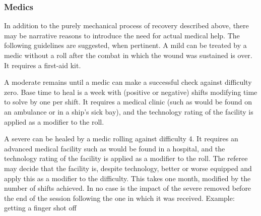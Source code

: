 \subsubsection{Medics}

In addition to the purely mechanical process of recovery described above, there may be narrative reasons to introduce the need for actual medical help. The following guidelines are suggested, when pertinent. A mild \Consequence{} can be treated by a medic without a roll after the combat in which the wound was sustained is over. It requires a first-aid kit.

A moderate \Consequence{} remains until a medic can make a successful check against difficulty zero. Base time to heal is a week with (positive or negative) shifts modifying time to solve by one per shift. It requires a medical clinic (such as would be found on an ambulance or in a ship's sick bay), and the technology rating of the facility is applied as a modifier to the roll.

A severe \Consequence{} can be healed by a medic rolling against difficulty 4. It requires an advanced medical facility such as would be found in a hospital, and the technology rating of the facility is applied as a modifier to the roll. The referee may decide that the facility is, despite technology, better or worse equipped and apply this as a modifier to the difficulty. This takes one month, modified by the number of shifts achieved. In no case is the impact of the severe \Consequence{} removed before the end of the session following the one in which it was received. Example: getting a finger shot off

